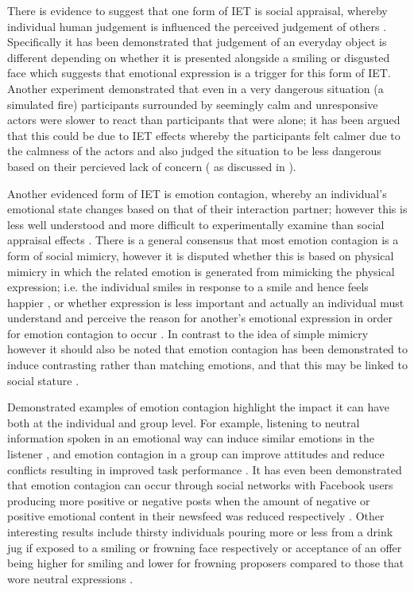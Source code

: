\documentclass[11pt]{article}
\begin{document}
There is evidence to suggest that one form of IET is social appraisal, whereby individual human judgement is influenced the perceived judgement of others \cite{parkinson2011interpersonal}. Specifically it has been demonstrated that judgement of an everyday object is different depending on whether it is presented alongside a smiling or disgusted face \cite{bayliss2007affective} which suggests that emotional expression is a trigger for this form of IET. Another experiment demonstrated that even in a very dangerous situation (a simulated fire) participants surrounded by seemingly calm and unresponsive actors were slower to react than participants that were alone; it has been argued that this could be due to IET effects whereby the participants felt calmer due to the calmness of the actors and also judged the situation to be less dangerous based on their percieved lack of concern (\cite{latane1968group} as discussed in \cite{parkinson2011interpersonal}).

Another evidenced form of IET is emotion contagion, whereby an individual's emotional state changes based on that of their interaction partner; however this is less well understood and more difficult to experimentally examine than social appraisal effects \cite{parkinson2011interpersonal}. There is a general consensus that most emotion contagion is a form of social mimicry, however it is disputed whether this is based on physical mimicry in which the related emotion is generated from mimicking the physical expression; i.e. the individual smiles in response to a smile and hence feels happier \cite{strack1988inhibiting}, or whether expression is less important and actually an individual must understand and perceive the reason for another's emotional expression in order for emotion contagion to occur \cite{tamietto2009unseen}. In contrast to the idea of simple mimicry however it should also be noted that emotion contagion has been demonstrated to induce contrasting rather than matching emotions, and that this may be linked to social stature \cite{tiedens2003power}.

Demonstrated examples of emotion contagion highlight the impact it can have both at the individual and group level. For example, listening to neutral information spoken in an emotional way can induce similar emotions in the listener \cite{neumann2000mood}, and emotion contagion in a group can improve attitudes and reduce conflicts resulting in improved task performance \cite{barsade2002ripple}. It has even been demonstrated that emotion contagion can occur through social networks with Facebook users producing more positive or negative posts when the amount of negative or positive emotional content in their newsfeed was reduced respectively \cite{kramer2014experimental}. Other interesting results include thirsty individuals pouring more or less from a drink jug if exposed to a smiling or frowning face respectively \cite{winkielman2005unconscious} or acceptance of an offer being higher for smiling and lower for frowning proposers compared to those that wore neutral expressions \cite{mussel2013value}. 
\end{document}
